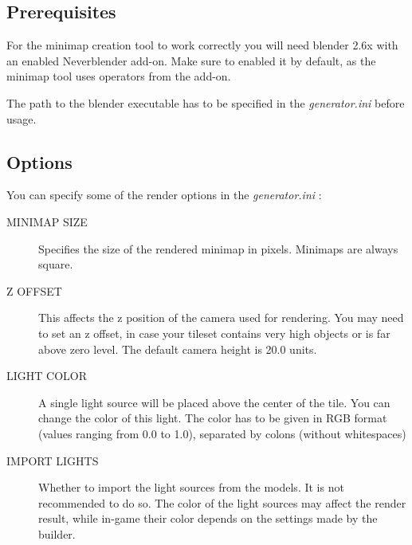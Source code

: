 \documentclass[a4paper]{article}
\begin{document}
\subsection{Prerequisites}
For the minimap creation tool to work correctly you will need blender 2.6x with an enabled Neverblender add-on. Make sure to enabled it by default, as the minimap tool uses operators from the add-on.

The path to the blender executable has to be specified in the {\itshape{generator.ini}} before usage.

\subsection{Options}
You can specify some of the render options in the {\itshape{generator.ini}} :
\begin{description}
\item[MINIMAP SIZE] Specifies the size of the rendered minimap in pixels. Minimaps are always square.
\item[Z OFFSET] This affects the z position of the camera used for rendering. You may need to set an z offset, in case your tileset contains very high objects or is far above zero level. The default camera height is 20.0 units.
\item[LIGHT COLOR] A single light source will be placed above the center of the tile. 
You can change the color of this light. The color has to be given in RGB format (values ranging from 0.0 to 1.0), separated by colons (without whitespaces)
\item[IMPORT LIGHTS] Whether to import the light sources from the models. It is not recommended
to do so. The color of the light sources may affect the render result, while in-game their color depends on the settings made by the builder.
\end{description}
\end{document}
